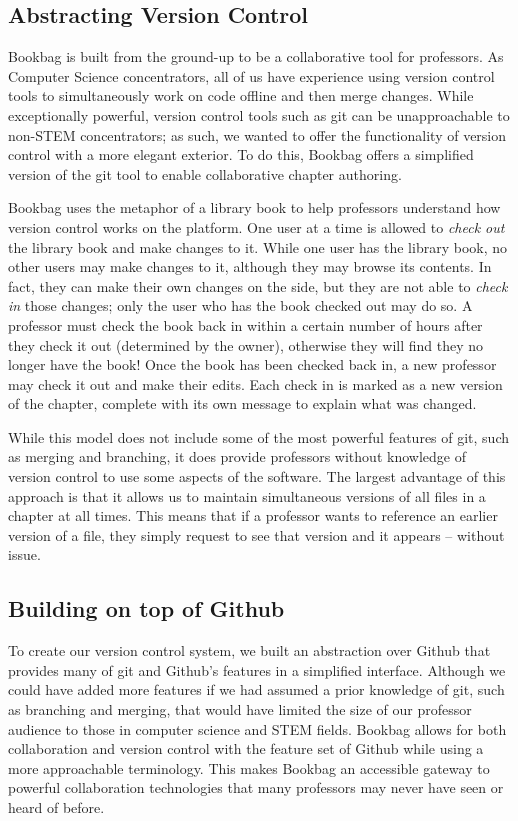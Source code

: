 \documentclass[pageno]{jpaper}
\begin{document}
\subsection{Abstracting Version Control}

Bookbag is built from the ground-up to be a collaborative tool for professors. As Computer Science concentrators, all of us have experience using version control tools to simultaneously work on code offline and then merge changes. While exceptionally powerful, version control tools such as git can be unapproachable to non-STEM concentrators; as such, we wanted to offer the functionality of version control with a more elegant exterior. To do this, Bookbag offers a simplified version of the git tool to enable collaborative chapter authoring.

Bookbag uses the metaphor of a library book to help professors understand how version control works on the platform. One user at a time is allowed to \textit{check out} the library book and make changes to it. While one user has the library book, no other users may make changes to it, although they may browse its contents. In fact, they can make their own changes on the side, but they are not able to \textit{check in} those changes; only the user who has the book checked out may do so. A professor must check the book back in within a certain number of hours after they check it out (determined by the owner), otherwise they will find they no longer have the book! Once the book has been checked back in, a new professor may check it out and make their edits. Each check in is marked as a new version of the chapter, complete with its own message to explain what was changed.

While this model does not include some of the most powerful features of git, such as merging and branching, it does provide professors without knowledge of version control to use some aspects of the software. The largest advantage of this approach is that it allows us to maintain simultaneous versions of all files in a chapter at all times. This means that if a professor wants to reference an earlier version of a file, they simply request to see that version and it appears – without issue.

\subsection{Building on top of Github}
To create our version control system, we built an abstraction over Github that provides many of git and Github's features in a simplified interface. Although we could have added more features if we had assumed a prior knowledge of git, such as branching and merging, that would have limited the size of our professor audience to those in computer science and STEM fields. Bookbag allows for both collaboration and version control with the feature set of Github while using a more approachable terminology. This makes Bookbag an accessible gateway to powerful collaboration technologies that many professors may never have seen or heard of before.
\end{document}
